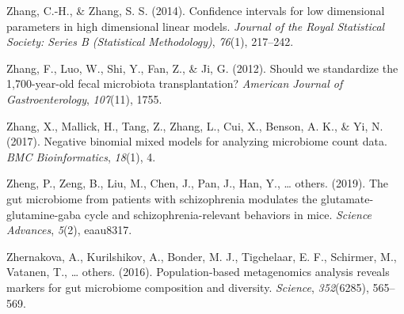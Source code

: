\documentclass[12pt,a4paper]{reedthesis}
\theoremstyle{definition}
\theoremstyle{definition}
\theoremstyle{definition}
\theoremstyle{remark}
\begin{document}
\leavevmode\hypertarget{ref-zhang2014confidence}{}%
Zhang, C.-H., \& Zhang, S. S. (2014). Confidence intervals for low dimensional parameters in high dimensional linear models. \emph{Journal of the Royal Statistical Society: Series B (Statistical Methodology)}, \emph{76}(1), 217--242.

\leavevmode\hypertarget{ref-zhang2012should}{}%
Zhang, F., Luo, W., Shi, Y., Fan, Z., \& Ji, G. (2012). Should we standardize the 1,700-year-old fecal microbiota transplantation? \emph{American Journal of Gastroenterology}, \emph{107}(11), 1755.

\leavevmode\hypertarget{ref-zhang2017negative}{}%
Zhang, X., Mallick, H., Tang, Z., Zhang, L., Cui, X., Benson, A. K., \& Yi, N. (2017). Negative binomial mixed models for analyzing microbiome count data. \emph{BMC Bioinformatics}, \emph{18}(1), 4.

\leavevmode\hypertarget{ref-zheng2019gut}{}%
Zheng, P., Zeng, B., Liu, M., Chen, J., Pan, J., Han, Y., \ldots{} others. (2019). The gut microbiome from patients with schizophrenia modulates the glutamate-glutamine-gaba cycle and schizophrenia-relevant behaviors in mice. \emph{Science Advances}, \emph{5}(2), eaau8317.

\leavevmode\hypertarget{ref-zhernakova2016population}{}%
Zhernakova, A., Kurilshikov, A., Bonder, M. J., Tigchelaar, E. F., Schirmer, M., Vatanen, T., \ldots{} others. (2016). Population-based metagenomics analysis reveals markers for gut microbiome composition and diversity. \emph{Science}, \emph{352}(6285), 565--569.

\newpage\thispagestyle{empty}\null

\ifthispageodd{}{\newpage\thispagestyle{empty}\null}
\newpage
\thispagestyle{empty}
\selectfont

\lhead{}
\rhead{}
\rfoot{}
\cfoot{}
\lfoot{}
\end{document}

